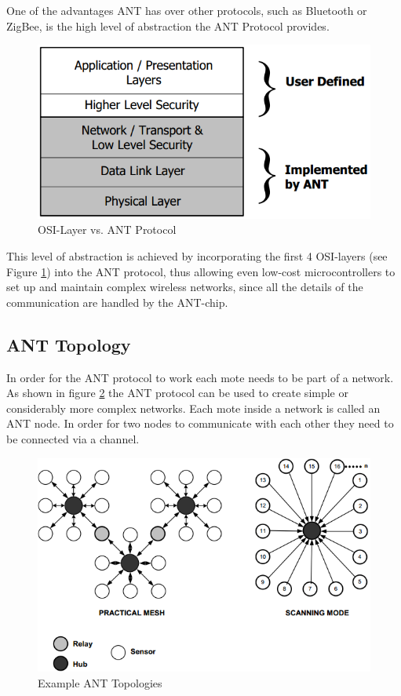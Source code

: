 One of the advantages ANT has over other protocols, such as Bluetooth or ZigBee, is the high level of abstraction the ANT Protocol provides. 
\begin{figure}[H]
	\centering
	\includegraphics[scale=.5]{content/images/ANTstack.png}
	\caption{OSI-Layer vs. ANT Protocol\cite{Networks}}\label{fig:osilayer}
\end{figure}

This level of abstraction is achieved by incorporating the first 4 OSI-layers (see Figure \ref{fig:osilayer}) into the ANT protocol, thus allowing even low-cost microcontrollers to set up and maintain complex wireless networks, since all the details of the communication are handled by the ANT-chip.

\subsection{ANT Topology}
In order for the ANT protocol to work each mote needs to be part of a network. As shown in figure \ref{fig:anttopo} the ANT protocol can be used to create simple or considerably more complex networks. Each mote inside a network is called an ANT node. In order for two nodes to communicate with each other they need to be connected via a channel.

\begin{figure}[H]
	\centering
	\includegraphics[scale=0.7]{content/images/ANTtopo.png}
	\caption{Example ANT Topologies\cite{DynastreamInnovationsInc.2013}}\label{fig:anttopo}
\end{figure}

